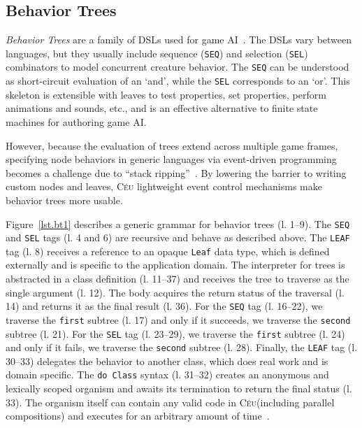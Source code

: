 \documentclass{sig-alternate}
\newcommand{\CEU}{\textsc{C\'{e}u}\xspace}
\newcommand{\code}[1] {{\small{\texttt{#1}}}}
\begin{document}
\subsection{Behavior Trees}
\label{subsec.bt}

\emph{Behavior Trees} are a family of DSLs used for game 
AI~\cite{isla2005,hecker2009my}.
The DSLs vary between languages, but they usually include sequence (\code{SEQ}) 
and selection (\code{SEL}) combinators to model concurrent creature behavior.
%
The \code{SEQ} can be understood as short-circuit evaluation of an `and',
while the \code{SEL} corresponds to an `or'.
%
This skeleton is extensible with leaves to test properties, set properties, 
perform animations and sounds, etc., and is an effective alternative to finite 
state machines for authoring game AI.

However, because the evaluation of trees extend across multiple game frames, 
specifying node behaviors in generic languages via event-driven programming 
becomes a challenge due to ``stack ripping''~\cite{krohn2007events}.
%
%
By lowering the barrier to writing custom nodes and leaves, \CEU lightweight 
event control mechanisms make behavior trees more usable.

Figure~\ref{lst.bt1} describes a generic grammar for behavior trees (l. 
1--9).
The \code{SEQ} and \code{SEL} tags (l. 4 and 6) are recursive and behave as 
described above.
%
The \code{LEAF} tag (l. 8) receives a reference to an opaque \code{Leaf} data 
type, which is defined externally and is specific to the application domain.
%
The interpreter for trees is abstracted in a class definition (l. 11--37) and 
receives the tree to traverse as the single argument (l. 12).
The body acquires the return status of the traversal (l. 14) and returns it as 
the final result (l. 36).
%
%
For the \code{SEQ} tag (l. 16--22), we traverse the \code{first} subtree 
(l. 17) and only if it succeeds, we traverse the \code{second} subtree (l. 
21).
%
For the \code{SEL} tag (l. 23--29), we traverse the \code{first} subtree 
(l. 24) and only if it fails, we traverse the \code{second} subtree (l. 
28).
%
Finally, the \code{LEAF} tag (l. 30--33) delegates the behavior to another 
class, which does real work and is domain specific.
The \code{do Class} syntax (l. 31--32) creates an anonymous and lexically 
scoped organism and awaits its termination to return the final status (l.  33).
The organism itself can contain any valid code in \CEU (including parallel 
compositions) and executes for an arbitrary amount of time~\cite{ceu.mod15}.
\end{document}
